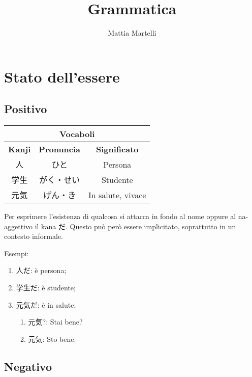 \documentclass{article}
\title{Grammatica}
\author{Mattia Martelli}
\date{}
\let\ita\textitalian
\let\jap\textjapanese
\newcommand{\itabf}[1]{\ita{\textbf{#1}}}
\newenvironment{tabVoc}{\begin{center}\begin{japanese}\begin{longtable}{|c|c|c|}}{\end{longtable}\end{japanese}\end{center}}
\begin{document}
    \maketitle

    \tableofcontents
    
    \section{Stato dell'essere}

        \subsection{Positivo}

            \begin{tabVoc}
                \hline
                \multicolumn{3}{|c|}{\itabf{Vocaboli}}\\
                \hline
                \itabf{Kanji} & \itabf{Pronuncia} & \itabf{Significato}\\
                \hline\hline
                人 & ひと & \ita{Persona}\\
                \hline
                学生 & がく・せい & \ita{Studente}\\
                \hline
                元気 & げん・き & \ita{In salute, vivace}\\
                \hline
            \end{tabVoc}

            Per esprimere l'esistenza di qualcosa si attacca in fondo al nome oppure al na-aggettivo il kana \jap{だ}. Questo può però
            essere implicitato, soprattutto in un contesto informale.

            Esempi:
            \begin{enumerate}
                \item \jap{人だ}: è persona;
                \item \jap{学生だ}: è studente;
                \item \jap{元気だ}: è in salute;
                    \begin{enumerate}
                        \item \jap{元気?}: Stai bene?
                        \item \jap{元気}: Sto bene.
                    \end{enumerate}
            \end{enumerate}

        \subsection{Negativo}
\end{document}
